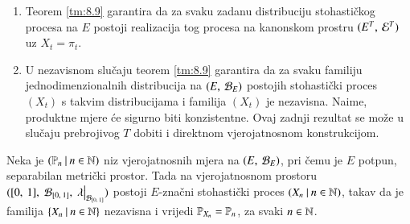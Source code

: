 \begin{nap} \label{nap:8.10}
    \begin{enumerate}[label=(\alph*)]
        \item Teorem \ref{tm:8.9} garantira da za svaku zadanu distribuciju stohasti\v ckog procesa na $E$ postoji realizacija tog procesa na kanonskom prostru $({E^T}, \: {\mathcal{E}^T})$ uz $X_t = \pi_t$.
        \item U nezavisnom slu\v caju teorem \ref{tm:8.9} garantira da za svaku familiju jednodimenzionalnih distribucija na $({E}, \: {\mathcal{B}_{E}})$ postojih stohasti\v cki proces $(X_t)$ s takvim distribucijama i familija $(X_t)$ je nezavisna.
        Naime, produktne mjere \' ce sigurno biti konzistentne.
        Ovaj zadnji rezultat se mo\v ze u slu\v caju prebrojivog $T$ dobiti i direktnom vjerojatnosnom konstrukcijom.
    \end{enumerate}
\end{nap}

\begin{tm}  \label{tm:8.11}
    Neka je $({\mathbb{P}_n} \: | \: {n \in \mathbb{N}})$ niz vjerojatnosnih mjera na $({E}, \: {\mathcal{B}_{E}})$, pri \v cemu je $E$ potpun, separabilan metri\v cki prostor.
    Tada na vjerojatnosnom prostoru $(\segment{0}{1}, \; \borel{\segment{0}{1}}, \; \restr{\lambda}{\borel{\segment{0}{1}}})$ postoji $E$-zna\v cni stohasti\v cki proces $({X_n} \: | \: {n \in \mathbb{N}})$, takav da je familija $\{{X_n} \: | \: {n \in \mathbb{N}}\}$ nezavisna i vrijedi $\mathbb{P}_{X_n} = \mathbb{P}_n$, za svaki $n \in \mathbb{N}$.
\end{tm}

